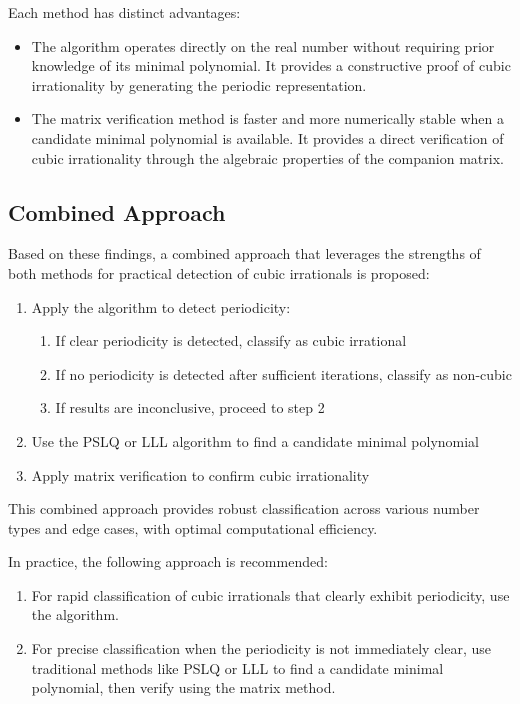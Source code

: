 Each method has distinct advantages:

\begin{itemize}
\item The \HAPD{} algorithm operates directly on the real number without requiring prior knowledge of its minimal polynomial. It provides a constructive proof of cubic irrationality by generating the periodic representation.

\item The matrix verification method is faster and more numerically stable when a candidate minimal polynomial is available. It provides a direct verification of cubic irrationality through the algebraic properties of the companion matrix.
\end{itemize}

\subsection{Combined Approach}

Based on these findings, a combined approach that leverages the strengths of both methods for practical detection of cubic irrationals is proposed:

\begin{algorithm_def}
\begin{enumerate}
\item Apply the \HAPD{} algorithm to detect periodicity:
   \begin{enumerate}
   \item If clear periodicity is detected, classify as cubic irrational
   \item If no periodicity is detected after sufficient iterations, classify as non-cubic
   \item If results are inconclusive, proceed to step 2
   \end{enumerate}
\item Use the PSLQ or LLL algorithm to find a candidate minimal polynomial
\item Apply matrix verification to confirm cubic irrationality
\end{enumerate}
\end{algorithm_def}

This combined approach provides robust classification across various number types and edge cases, with optimal computational efficiency.

In practice, the following approach is recommended:
\begin{enumerate}
\item For rapid classification of cubic irrationals that clearly exhibit periodicity, use the \HAPD{} algorithm.
\item For precise classification when the periodicity is not immediately clear, use traditional methods like PSLQ or LLL to find a candidate minimal polynomial, then verify using the matrix method.
\end{enumerate}

